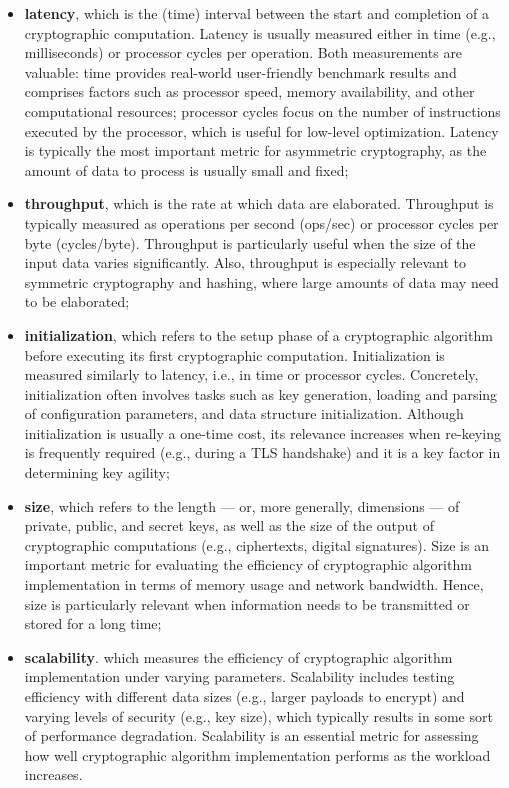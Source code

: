 \begin{itemize}
	
	\item \textbf{latency}, which is the (time) interval between the start and completion of a cryptographic computation. Latency is usually measured either in time (e.g., milliseconds) or processor cycles per operation. Both measurements are valuable: time provides real-world user-friendly benchmark results and comprises factors such as processor speed, memory availability, and other computational resources; processor cycles focus on the number of instructions executed by the processor, which is useful for low-level optimization. Latency is typically the most important metric for asymmetric cryptography, as the amount of data to process is usually small and fixed;
	
	\item \textbf{throughput}, which is the rate at which data are elaborated. Throughput is typically measured as operations per second (ops/sec) or processor cycles per byte (cycles/byte). Throughput is particularly useful when the size of the input data varies significantly. Also, throughput is especially relevant to symmetric cryptography and hashing, where large amounts of data may need to be elaborated;
	
	\item \textbf{initialization}, which refers to the setup phase of a cryptographic algorithm before executing its first cryptographic computation. Initialization is measured similarly to latency, i.e., in time or processor cycles. Concretely, initialization often involves tasks such as key generation, loading and parsing of configuration parameters, and data structure initialization. Although initialization is usually a one-time cost, its relevance increases when re-keying is frequently required (e.g., during a TLS handshake) and it is a key factor in determining key agility;
	
	\item \textbf{size}, which refers to the length --- or, more generally, dimensions --- of private, public, and secret keys, as well as the size of the output of cryptographic computations (e.g., ciphertexts, digital signatures). Size is an important metric for evaluating the efficiency of cryptographic algorithm implementation in terms of memory usage and network bandwidth. Hence, size is particularly relevant when information needs to be transmitted or stored for a long time;
	
	\item \textbf{scalability}. which measures the efficiency of cryptographic algorithm implementation under varying parameters. Scalability includes testing efficiency with different data sizes (e.g., larger payloads to encrypt) and varying levels of security (e.g., key size), which typically results in some sort of performance degradation. Scalability is an essential metric for assessing how well cryptographic algorithm implementation performs as the workload increases.
	
\end{itemize}


